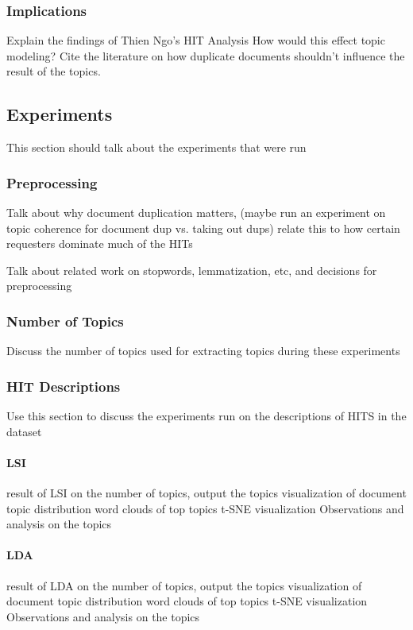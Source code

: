 \documentclass[letterpaper,12pt]{article}
\begin{document}
\subsubsection{Implications}
Explain the findings of Thien Ngo's HIT Analysis
How would this effect topic modeling?
Cite the literature on how duplicate documents shouldn't influence the result of the topics.

\subsection{Experiments}
This section should talk about the experiments that were run

\subsubsection{Preprocessing}
Talk about why document duplication matters,
(maybe run an experiment on topic coherence for document dup vs. taking out dups) relate this to
how certain requesters dominate much of the HITs

Talk about related work on stopwords, lemmatization, etc, and decisions for preprocessing

\subsubsection{Number of Topics}
Discuss the number of topics used for extracting topics during these experiments

\subsubsection{HIT Descriptions}
Use this section to discuss the experiments run on the descriptions of HITS in the dataset

\paragraph{LSI}
result of LSI on the number of topics, output the topics
visualization of document topic distribution
word clouds of top topics
t-SNE visualization
Observations and analysis on the topics

\paragraph{LDA}
result of LDA on the number of topics, output the topics
visualization of document topic distribution
word clouds of top topics
t-SNE visualization
Observations and analysis on the topics
\end{document}
